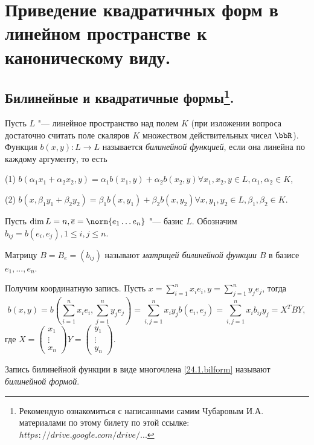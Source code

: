 \chapter{Приведение квадратичных форм в линейном пространстве к каноническому виду.}

\section[Билинейные и квадратичные формы.]{Билинейные и квадратичные формы\footnote{Рекомендую ознакомиться с написанными самим Чубаровым И.А. материалами по этому билету по этой ссылке: \href{https://drive.google.com/drive/u/0/folders/0BzuzEyNkpwYDcFhhV1l2N1lhY2s}{$https://drive.google.com/drive/...$}}.}
  \begin{defn}  
  Пусть $L$ "--- линейное пространство над полем $K$ (при изложении вопроса достаточно считать поле скаляров $K$ множеством действительных чисел $\bbR$). 
Функция $b(x,y): L\rightarrow L$ называется \textit{билинейной функцией}, если она линейна по каждому аргументу, то есть

(1) $b(\alpha_1 x_1+\alpha_2 x_2,y)=\alpha_1 b(x_1,y)+\alpha_2 b(x_2,y) \forall x_1,x_2,y \in L, \alpha_1,\alpha_2 \in K$,

(2) $b(x,\beta_1 y_1+\beta_2 y_2)=\beta_1 b(x,y_1)+\beta_2 b(x,y_2)  \forall x,y_1,y_2 \in L, \beta_1,\beta_2 \in K$.
  \end{defn}
  Пусть $\dim L=n, \overline{e}=\norm{e_1 \ldots e_n}$ "--- базис $L$. Обозначим $b_{ij}=b(e_i,e_j), 1\le i,j \le n$.
  \begin{defn}
  Матрицу $B=B_e=(b_{ij})$ называют \textit{матрицей билинейной 	функции} $B$ в базисе $e_1,...,e_n$.
  \end{defn}
  
  Получим координатную запись. Пусть $x=\sum\limits_{i=1}^nx_ie_i,y=\sum\limits_{j=1}^ny_je_j$, тогда
  \begin{equation}\label{24.1.bilform}
  b(x,y)=b(\sum_{i=1}^nx_ie_i,\sum_{j=1}^ny_je_j)=\sum_{i,j=1}^nx_iy_jb(e_i,e_j)=\sum_{i,j=1}^nx_ib_{ij}y_j=X^TBY,
  \end{equation}
где $X=\begin{pmatrix}
x_1 \\ \vdots \\ x_n
\end{pmatrix} Y=\begin{pmatrix}
y_1 \\ \vdots \\ y_n
\end{pmatrix}$.
  \begin{defn}
  Запись билинейной функции в виде многочлена \eqref{24.1.bilform} называют \textit{билинейной формой}.
  \end{defn}

